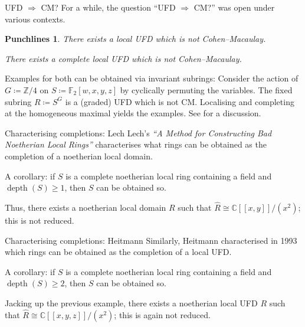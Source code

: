\documentclass{beamer}
\newtheorem{punchlines}[theorem]{Punchlines}
\DeclareMathOperator{\depth}{depth}
\begin{document}
	\begin{frame}{UFD \texorpdfstring{$\Rightarrow$}{=>} CM?}
		For a while, the question ``UFD $\Rightarrow$ CM?'' was open under various contexts. \pause 

		\begin{punchlines}
			There exists a local UFD which is not Cohen--Macaulay. \pause

			There exists a complete local UFD which is not Cohen--Macaulay. 
		\end{punchlines} \pause
		Examples for both can be obtained via invariant subrings: \pause Consider the action of $G \coloneqq \mathbb{Z}/4$ on $S \coloneqq \mathbb{F}_{2}[w, x, y, z]$ by cyclically permuting the variables. \pause The fixed subring $R \coloneqq S^{G}$ is a (graded) UFD which is not CM. \pause Localising and completing at the homogeneous maximal yields the examples. \newline
		\phantom{h} \hfill {\footnotesize See \cite[\S4]{LipmanUFDs} for a discussion.}
	\end{frame}

	\begin{frame}{Characterising completions: Lech}
		Lech's \emph{``A Method for Constructing Bad Noetherian Local Rings''} \cite{LechBadNoetherianLocal} characterises what rings can be obtained as the completion of a noetherian local domain. \pause

		A corollary: if $S$ is a complete noetherian local ring \pause containing a field \pause and $\depth(S) \ge 1$, then $S$ can be obtained so. \pause

		Thus, there exists a noetherian local domain $R$ such that $\widehat{R} \cong \mathbb{C}[\![x, y]\!]/(x^{2})$; \pause this is not reduced.
	\end{frame}
	\begin{frame}{Characterising completions: Heitmann}
		Similarly, Heitmann \cite{HeitmannCharacterizeUFDCompletion} characterised in 1993 which rings can be obtained as the completion of a local UFD. \pause 

		A corollary: if $S$ is a complete noetherian local ring containing a field and $\depth(S) \ge 2$, then $S$ can be obtained so. \pause

		Jacking up the previous example, there exists a noetherian local UFD $R$ such that $\widehat{R} \cong \mathbb{C}[\![x, y, z]\!]/(x^{2})$; this is again not reduced.
	\end{frame}
\end{document}
